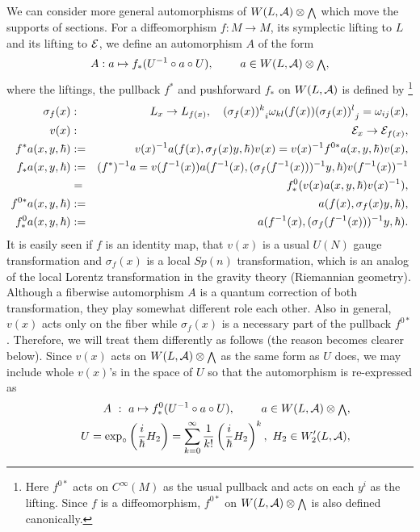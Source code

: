 \documentclass[10pt,a4paper]{article}
\def\h{\hbar}
\begin{document}
We can consider more general automorphisms of $W(L,{\cal A})\otimes {\scriptstyle \bigwedge}$ which move the supports of sections. For a diffeomorphism $f:M\rightarrow M$, its symplectic lifting to $L$ and its lifting to ${\cal E}$, we define an automorphism $A$ of the form
\begin{equation} 
A: a\mapsto f_*(U^{-1}\circ a \circ U),\ \qquad  a\in W(L,{\cal A})\otimes {\scriptstyle \bigwedge},
\end{equation}
where the liftings, the pullback $f^*$ and pushforward $f_*$ on $W(L,{\cal A})$ is defined by
\footnote{
Here $f^{0*}$ acts on $C^\infty(M)$ as the usual pullback and acts on each $y^i$ as the lifting. Since $f$ is a diffeomorphism, $f^{0*}$ on $W(L,{\cal A})\otimes {\scriptstyle \bigwedge}$ is also defined canonically. 
}
\begin{eqnarray}
\sigma_f(x)&:& L_x \rightarrow L_{f(x)},
\ \ \ {(\sigma_f(x))^k}_i\omega_{kl}(f(x)){(\sigma_f(x))^l}_j=\omega_{ij}(x),\nonumber\\
v(x)&:&{\cal E}_x \rightarrow{\cal E}_{f(x)},\nonumber\\
f^*a(x,y,\h)&:=&v(x)^{-1} a(f(x),\sigma_f(x)y,\h )v(x)=v(x)^{-1}f^{0*}a(x,y,\h)v(x),\nonumber\\
f_*a(x,y,\h)&:=&(f^*)^{-1} a=v(f^{-1}(x))a(f^{-1}(x),(\sigma_f(f^{-1}(x)))^{-1}y,\h)v(f^{-1}(x))^{-1}\nonumber\\
&=&f^0_*(v(x)a(x,y,\h)v(x)^{-1}),\nonumber\\
f^{0*}a(x,y,\h)&:=&a(f(x),\sigma_f(x)y,\h),\nonumber\\
f^0_*a(x,y,\h)&:=&a(f^{-1}(x),(\sigma_f(f^{-1}(x)))^{-1}y,\h).
\end{eqnarray}
It is easily seen if $f$ is an identity map, that $v(x)$ is a usual $U(N)$ gauge transformation and $\sigma_f(x)$ is a local $Sp(n)$ transformation, which is an analog of the local Lorentz transformation in the gravity theory (Riemannian geometry). Although a fiberwise automorphism $A$ is a quantum correction of both transformation, they play somewhat different role each other. Also in general, $v(x)$ acts only on the fiber while $\sigma_f(x)$ is a necessary part of the pullback $f^{0*}$.  Therefore, we will treat them differently as follows (the reason becomes clearer below). Since $v(x)$ acts on $W(L,{\cal A})\otimes {\scriptstyle \bigwedge}$ as the same form as $U$ does, we may include whole $v(x)$'s in the space of $U$ so that the automorphism is re-expressed as
\begin{eqnarray}
\label{eqn:auto}
&& A\ : \ a\mapsto f^0_*(U^{-1}\circ a \circ U),\ \qquad  a\in W(L,{\cal A})\otimes {\scriptstyle \bigwedge}, \nonumber \\     
&& U = \exp_{\circ}\left({i\over\h}H_2\right)=\sum_{k=0}^\infty{1\over k!}\left({i\over\h}H_2\right)^k,\ H_2\in W_2'(L,{\cal A}), 
\end{eqnarray}
\end{document}
